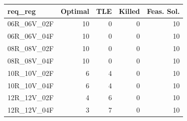
\begin{tabular}{lrrrr}
\toprule
req\_reg & Optimal & TLE & Killed & Feas. Sol.\\
\midrule
06R\_06V\_02F & 10 & 0 & 0 & 10\\
06R\_06V\_04F & 10 & 0 & 0 & 10\\
08R\_08V\_02F & 10 & 0 & 0 & 10\\
08R\_08V\_04F & 10 & 0 & 0 & 10\\
10R\_10V\_02F & 6 & 4 & 0 & 10\\
\addlinespace
10R\_10V\_04F & 6 & 4 & 0 & 10\\
12R\_12V\_02F & 4 & 6 & 0 & 10\\
12R\_12V\_04F & 3 & 7 & 0 & 10\\
\bottomrule
\end{tabular}
